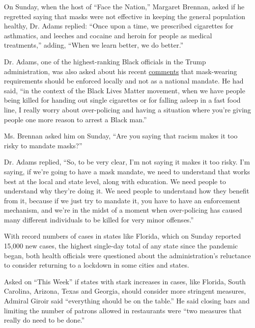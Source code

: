 On Sunday, when the host of ``Face the Nation,'' Margaret Brennan, asked
if he regretted saying that masks were not effective in keeping the
general population healthy, Dr. Adams replied: ``Once upon a time, we
prescribed cigarettes for asthmatics, and leeches and cocaine and heroin
for people as medical treatments,'' adding, ``When we learn better, we
do better.''

Dr. Adams, one of the highest-ranking Black officials in the Trump
administration, was also asked about his recent
\href{https://www.fox5dc.com/news/us-surgeon-general-stresses-importance-of-wearing-face-coverings-to-reduce-spread-of-covid-19}{comments}
that mask-wearing requirements should be enforced locally and not as a
national mandate. He had said, ``in the context of the Black Lives
Matter movement, when we have people being killed for handing out single
cigarettes or for falling asleep in a fast food line, I really worry
about over-policing and having a situation where you're giving people
one more reason to arrest a Black man.''

Ms. Brennan asked him on Sunday, ``Are you saying that racism makes it
too risky to mandate masks?''

Dr. Adams replied, ``So, to be very clear, I'm not saying it makes it
too risky. I'm saying, if we're going to have a mask mandate, we need to
understand that works best at the local and state level, along with
education. We need people to understand why they're doing it. We need
people to understand how they benefit from it, because if we just try to
mandate it, you have to have an enforcement mechanism, and we're in the
midst of a moment when over-policing has caused many different
individuals to be killed for very minor offenses.''

With record numbers of cases in states like Florida, which on Sunday
reported 15,000 new cases, the highest single-day total of any state
since the pandemic began, both health officials were questioned about
the administration's reluctance to consider returning to a lockdown in
some cities and states.

Asked on ``This Week'' if states with stark increases in cases, like
Florida, South Carolina, Arizona, Texas and Georgia, should consider
more stringent measures, Admiral Giroir said ``everything should be on
the table.'' He said closing bars and limiting the number of patrons
allowed in restaurants were ``two measures that really do need to be
done.''

\href{https://www.nytimes.com/news-event/coronavirus?action=click\&pgtype=Article\&state=default\&region=MAIN_CONTENT_3\&context=storylines_faq}{}

